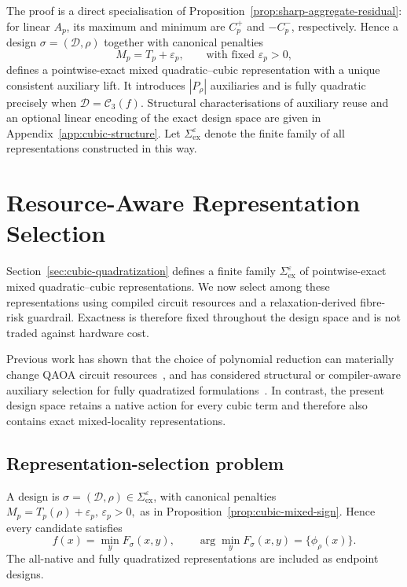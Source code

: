 \documentclass[a4paper,onecolumn,11pt,unpublished]{quantumarticle}
\theoremstyle{remark}
\begin{document}
The proof is a direct specialisation of Proposition~\ref{prop:sharp-aggregate-residual}:
for linear $A_p$, its maximum and minimum are $C_p^+$ and $-C_p^-$,
respectively. 
Hence a design $\sigma=(\mathcal D,\rho)$ together with canonical penalties
\begin{equation}
M_p=T_p+\varepsilon_p,
\qquad
\text{with fixed }\varepsilon_p>0,
\label{eq:canonical-cubic-penalty}
\end{equation}
defines a pointwise-exact mixed quadratic--cubic representation with a unique
consistent auxiliary lift. It introduces $|P_\rho|$ auxiliaries and is fully
quadratic precisely when $\mathcal D=\mathcal C_3(f)$.
Structural characterisations of auxiliary reuse and an optional linear
encoding of the exact design space are given in
Appendix~\ref{app:cubic-structure}.
Let $\Sigma_{\mathrm{ex}}^\varepsilon$ denote the finite family of all
representations constructed in this way.


\section{Resource-Aware Representation Selection}
\label{sec:selection}

Section~\ref{sec:cubic-quadratization} defines a finite family
$\Sigma_{\mathrm{ex}}^\varepsilon$ of
pointwise-exact mixed quadratic--cubic representations. We now select among
these representations using compiled circuit resources and a
relaxation-derived fibre-risk guardrail. Exactness is therefore fixed
throughout the design space and is not traded against hardware cost.

Previous work has shown that the choice of polynomial reduction can materially
change QAOA circuit resources~\cite{Schmidbauer2024}, and has considered
structural or compiler-aware auxiliary selection for fully quadratized
formulations~\cite{Herrman2021,Schmidbauer2026,Rovara2026}.  In contrast, the
present design space retains a native action for every cubic term and therefore
also contains exact mixed-locality representations.

\subsection{Representation-selection problem}
\label{sec:selection-problem}

A design is $\sigma=(\mathcal D,\rho)\in\Sigma_{\mathrm{ex}}^\varepsilon$,
with canonical penalties
\(
M_p=T_p(\rho)+\varepsilon_p,\, \varepsilon_p>0,
\)
as in Proposition~\ref{prop:cubic-mixed-sign}. Hence every candidate satisfies
\[
f(x)=\min_y F_\sigma(x,y),
\qquad
\arg\min_y F_\sigma(x,y)=\{\phi_\rho(x)\}.
\]
The all-native and fully quadratized representations are included as endpoint
designs.
\end{document}
